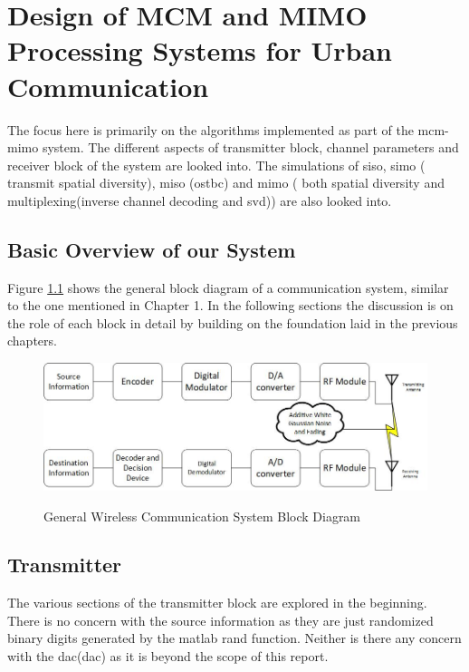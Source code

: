 \chapter{Design of MCM and MIMO Processing Systems for Urban Communication}

The focus here is primarily on the algorithms implemented as part of the \acrshort{mcm}-\acrshort{mimo} system. The different aspects of transmitter block, channel parameters and receiver block of the system are looked into. The simulations of \acrshort{siso}, \acrshort{simo} ( transmit \gls{spatial diversity}), \acrshort{miso} (\acrshort{ostbc}) and \acrshort{mimo} ( both \gls{spatial diversity} and multiplexing(inverse channel decoding and \acrshort{svd})) are also looked into.
 
\section{Basic Overview of our System}

Figure \ref{fig:general block digram} shows the general block diagram of a communication system, similar to the one mentioned in Chapter 1.
In the following sections the discussion is on the role of each block in detail by building on the foundation laid in the previous chapters.

\begin{figure}[!htbp]
\centering
\includegraphics[scale=0.8]{Chapter 3/Figures/Wireless Communication System Block Diagram}
\label{fig:general block digram}
\caption{General Wireless Communication System Block Diagram}
\end{figure}

\section{Transmitter}

The various sections of the transmitter block are explored in the beginning. There is no concern with the source information as they are just randomized binary digits generated by the \gls{matlab} rand function. Neither is there any concern with the \acrlong{dac}(\acrshort{dac}) as it is beyond the scope of this report.\\

